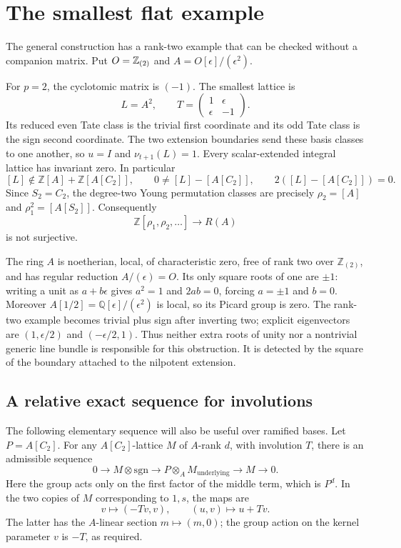 \section{The smallest flat example}
\label{sec:dual-number-obstruction}

The general construction has a rank-two example that can be checked
without a companion matrix.  Put $O=\mathbb Z_{(2)}$ and
$A=O[\epsilon]/(\epsilon^2)$.

For $p=2$, the cyclotomic matrix is $(-1)$.  The smallest lattice is
\[
 L=A^2,\qquad
 T=\begin{pmatrix}1&\epsilon\\\epsilon&-1\end{pmatrix}.
\]
Its reduced even Tate class is the trivial first coordinate and its odd
Tate class is the sign second coordinate.  The two extension boundaries
send these basis classes to one another, so $u=I$ and
$\nu_{t+1}(L)=1$.  Every scalar-extended integral lattice has invariant zero.
In particular
\[
 [L]\notin\mathbb Z[A]+\mathbb Z[A[C_2]],\qquad
 0\ne[L]-[A[C_2]],\qquad
 2([L]-[A[C_2]])=0.
\]
Since $S_2=C_2$, the degree-two Young permutation classes are precisely
$\rho_2=[A]$ and $\rho_1^2=[A[S_2]]$.  Consequently
\[
 \mathbb Z[\rho_1,\rho_2,\ldots]\longrightarrow R(A)
\]
is not surjective.

The ring $A$ is noetherian, local, of characteristic zero, free of rank two
over $\mathbb Z_{(2)}$, and has regular reduction $A/(\epsilon)=O$.  Its
only square roots of one are $\pm1$: writing a unit as $a+b\epsilon$ gives
$a^2=1$ and $2ab=0$, forcing $a=\pm1$ and $b=0$.  Moreover
$A[1/2]=\mathbb Q[\epsilon]/(\epsilon^2)$ is local, so its Picard group is
zero.  The rank-two example becomes trivial plus sign after inverting two;
explicit eigenvectors are $(1,\epsilon/2)$ and $(-\epsilon/2,1)$.
Thus neither extra roots of unity nor a nontrivial generic line bundle is
responsible for this obstruction.  It is detected by the square of the
boundary attached to the nilpotent extension.

\subsection{A relative exact sequence for involutions}

The following elementary sequence will also be useful over ramified bases.
Let $P=A[C_2]$.  For any $A[C_2]$-lattice $M$ of
$A$-rank $d$, with involution $T$, there is an admissible sequence
\begin{equation}
\label{eq:dual-relative-resolution}
 0\longrightarrow M\otimes\mathrm{sgn}
 \longrightarrow P\otimes_A M_{\mathrm{underlying}}
 \longrightarrow M\longrightarrow0.
\end{equation}
Here the group acts only on the first factor of the middle term, which is
$P^d$.  In the two copies of $M$ corresponding to $1,s$, the maps are
\[
 v\longmapsto(-Tv,v),\qquad
 (u,v)\longmapsto u+Tv.
\]
The latter has the $A$-linear section $m\mapsto(m,0)$; the group action on
the kernel parameter $v$ is $-T$, as required.  

